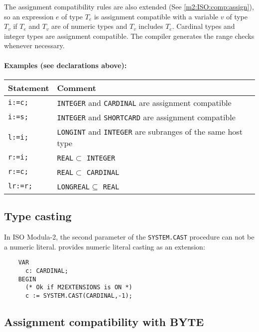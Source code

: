 The assignment compatibility rules  are  also  extended  (See
\ref{m2:ISO:comp:assign}),  so an expression $e$ of type $T_e$ is
assignment  compatible with a variable $v$ of type $T_v$ if $T_e$
and $T_v$ are of numeric types and $T_v$ includes $T_e$. Cardinal
types  and integer types are assignment compatible. The compiler
generates the range checks whenever necessary.

\paragraph{Examples (see declarations above):}
\begin{center}
\begin{tabular}{ll}
\bf Statement &\bf Comment \\ \hline
\tt i:=c;     & {\tt INTEGER} and {\tt CARDINAL} are assignment compatible \\
\tt i:=s;     & {\tt INTEGER} and {\tt SHORTCARD} are assignment compatible \\
\tt l:=i;     & {\tt LONGINT} and {\tt INTEGER} are subranges of the same
                host type                                                  \\
\tt r:=i;     & {\tt REAL}$\subset$ {\tt INTEGER}                           \\
\tt r:=c;     & {\tt REAL}$\subset$ {\tt CARDINAL}                          \\
\tt lr:=r;    & {\tt LONGREAL}$\subseteq$ {\tt REAL}                          \\
\end{tabular}
\end{center}

\subsection{Type casting}

\mextonly

In ISO Modula-2, the second parameter of the \verb'SYSTEM.CAST' procedure
can not be a numeric literal. \XDS{} provides numeric literal casting as
an extension:

\begin{verbatim}
    VAR
      c: CARDINAL;
    BEGIN
      (* Ok if M2EXTENSIONS is ON *)
      c := SYSTEM.CAST(CARDINAL,-1); 
\end{verbatim}

\subsection{Assignment compatibility with BYTE}

